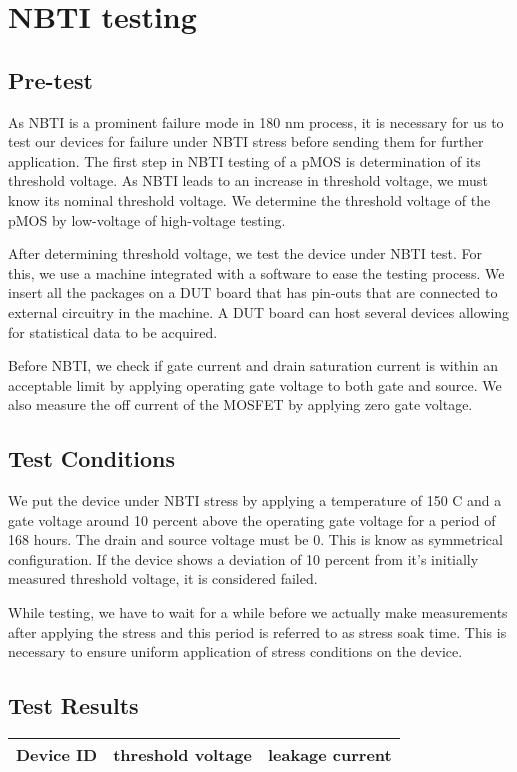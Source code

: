 \chapter{NBTI testing}



\section{Pre-test}
As NBTI is a prominent failure mode in 180 nm process, it is necessary for us to test our devices for failure under NBTI stress before sending them for further application. The first step in NBTI testing of a pMOS is determination of its threshold voltage. As NBTI leads to an increase in threshold voltage, we must know its nominal threshold voltage. We determine the threshold voltage of the pMOS by low-voltage of high-voltage testing. 

\noindent After determining threshold voltage, we test the device under NBTI test. For this, we use a machine integrated with a software to ease the testing process. We insert all the packages on a DUT board that has pin-outs that are connected to external circuitry in the machine. A DUT board can host several devices allowing for statistical data to be acquired.

Before NBTI, we check if gate current and drain saturation current is within an acceptable limit by applying operating gate voltage to both gate and source. We also measure the off current of the MOSFET by applying zero gate voltage.

\section{Test Conditions}
We put the device under NBTI stress by applying a temperature of 150 C and a gate voltage around 10 percent above the operating gate voltage for a period of 168 hours. The drain and source voltage must be 0. This is know as symmetrical configuration. If the device shows a deviation of 10 percent from it's initially measured threshold voltage, it is considered failed. 

While testing, we have to wait for a while before we actually make measurements after applying the stress and this period is referred to as stress soak time. This is necessary to ensure uniform application of stress conditions on the device.

\pagebreak
\section{Test Results}



\begin{tabularx}{0.8\textwidth} { 
  | >{\raggedright\arraybackslash}X 
  | >{\centering\arraybackslash}X 
  | >{\raggedleft\arraybackslash}X | }
 \hline
 Device ID & threshold voltage & leakage current \\
 \hline
\hline
\end{tabularx}





